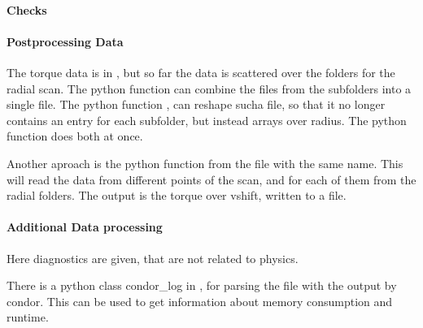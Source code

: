 \paragraph{Checks}

\paragraph{Postprocessing Data}
The torque data is in , but so far the
data is scattered over the folders for the radial scan. The python
function  can
combine the files from the subfolders into a single file. The python
function , can reshape sucha file, so that
it no longer contains an entry for each subfolder, but instead arrays
over radius. The python function  does
both at once.

Another aproach is the python function  from
the file with the same name. This will read the data from different
points of the scan, and for each of them from the radial folders. The
output is the torque over vshift, written to a file.

\paragraph{Additional Data processing}
Here diagnostics are given, that are not related to physics.

There is a python class condor\_log in
, for parsing the file with the output
by condor. This can be used to get information about memory consumption
and runtime.





